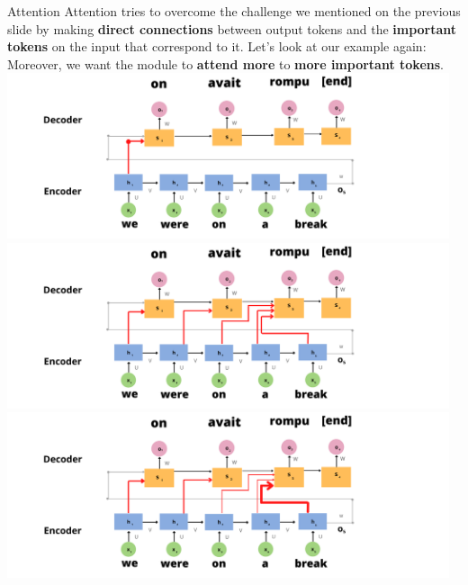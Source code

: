 \documentclass[9pt]{beamer}
\begin{document}
\begin{frame}{Attention}
Attention tries to overcome the challenge we mentioned on the previous slide by making \textbf{direct connections} between output tokens and the \textbf{important tokens} on the input that correspond to it.  {Let's look at our example again:}
 {Moreover, we want the module to \textbf{attend more} to \textbf{more important tokens}.}
\centering
{} {
        \includegraphics[width = 13cm]{img/attn_intuiton1.png}
}
 {
        \includegraphics[width = 13cm]{img/attn_intuiton2.png}
}
 {
        \includegraphics[width = 13cm]{img/attn_intuiton3.png}
}
\end{frame}
\end{document}
